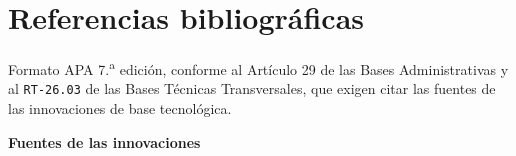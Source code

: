 \section*{Referencias bibliográficas}

\noindent\small\textcolor{terabyteGris}{%
Formato APA 7.\textsuperscript{a} edición, conforme al Artículo
29\textdegree{} de las Bases Administrativas y al \texttt{RT-26.03} de las
Bases Técnicas Transversales, que exigen citar las fuentes de las
innovaciones de base tecnológica.}

\vspace{10pt}
\noindent\textbf{\small Fuentes de las innovaciones}

\vspace{4pt}
